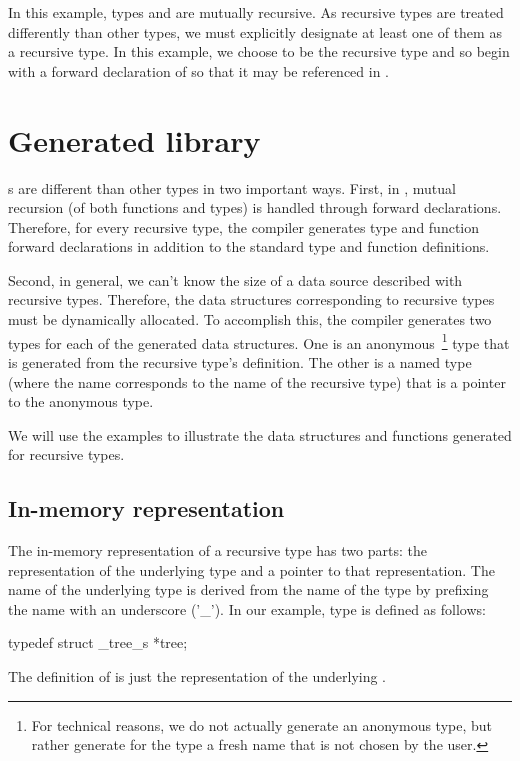 In this example, types  and  are mutually
recursive. As recursive types are treated differently than other
types, we must explicitly designate at least one of them as a
recursive type.  In this example, we choose  to be the
recursive type and so begin with a forward declaration of  so
that it may be referenced in .

\section{Generated library}

\Precur{}s are different than other types in two important ways.
First, in \C{}, mutual recursion (of both functions and types) is handled
through forward declarations. Therefore, for every recursive type, the
compiler generates type and function forward declarations in addition
to the standard type and function definitions.

Second, in general, we can't know the size of a data source described
with recursive types. Therefore, the data structures corresponding to
recursive types must be dynamically allocated. To accomplish this, the
compiler generates two types for each of the generated data
structures. One is an anonymous~\footnote{For technical reasons, we do
  not actually generate an anonymous type, but rather generate for the
  type a fresh name that is not chosen by the user.} type that is
generated from the recursive type's definition. The other is a named
type (where the name corresponds to the name of the recursive type)
that is a pointer to the anonymous type. 

We will use the  examples to illustrate the data structures
and functions generated for recursive types.

\subsection{In-memory representation}
\label{sec:recur-rep}

The in-memory representation of a recursive type has two parts: the
representation of the underlying type and a pointer to that
representation. The name of the underlying type is derived from the
name of the type by prefixing the name with an underscore ('\_'). In
our example, type  is defined as follows:
\begin{code}
typedef struct _tree_s    *tree;
\end{code}
The definition of  is just the representation of
the underlying \Punion{}.

